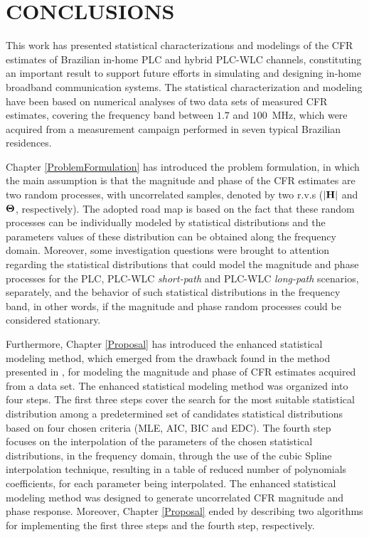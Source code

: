 \chapter{CONCLUSIONS} \label{Conclusions}

This work has presented statistical characterizations and modelings of the \ac{CFR} estimates of Brazilian in-home \ac{PLC} and hybrid \ac{PLC}-\ac{WLC} channels, constituting an important result to support future efforts in simulating and designing in-home broadband communication systems. The statistical characterization and modeling have been based on numerical analyses of two data sets of measured \ac{CFR} estimates, covering the frequency band between $1.7$ and $100$~MHz, which were acquired from a measurement campaign performed in seven typical Brazilian residences. 

Chapter \ref{ProblemFormulation} has introduced the problem formulation, in which the main assumption is that the magnitude and phase of the \ac{CFR} estimates are two random processes, with uncorrelated samples, denoted by two \acp{r.v.} ($|{\bf H}|$ and ${\bf \Theta}$, respectively). The adopted road map is based on the fact that these random processes can be individually modeled by statistical distributions and the parameters values of these distribution can be obtained along the frequency domain.  Moreover, some investigation questions were brought to attention regarding the statistical distributions that could model the magnitude and phase processes for the \ac{PLC}, \ac{PLC}-\ac{WLC} \textit{short-path} and \ac{PLC}-\ac{WLC} \textit{long-path} scenarios, separately, and the behavior of such statistical distributions in the frequency band, in other words, if the magnitude and phase random processes could be considered stationary.

Furthermore, Chapter \ref{Proposal} has introduced the enhanced statistical modeling method, which emerged from the drawback found in the method presented in \cite{Luis:AI,Luis:doc}, for modeling the magnitude and phase of \ac{CFR} estimates acquired from a data set. The enhanced statistical modeling method was organized into four steps. The first three steps cover the search for the most suitable statistical distribution among a predetermined set of candidates statistical distributions based on four chosen criteria (\ac{MLE}, \ac{AIC}, \ac{BIC} and \ac{EDC}). The fourth step focuses on the interpolation of the parameters of the chosen statistical distributions, in the frequency domain, through the use of the cubic Spline interpolation technique, resulting in a table of reduced number of polynomials coefficients, for each parameter being interpolated. The enhanced statistical modeling method was designed to generate uncorrelated \ac{CFR} magnitude and phase response. Moreover, Chapter \ref{Proposal} ended by describing two algorithms for implementing the first three steps and the fourth step, respectively. 

